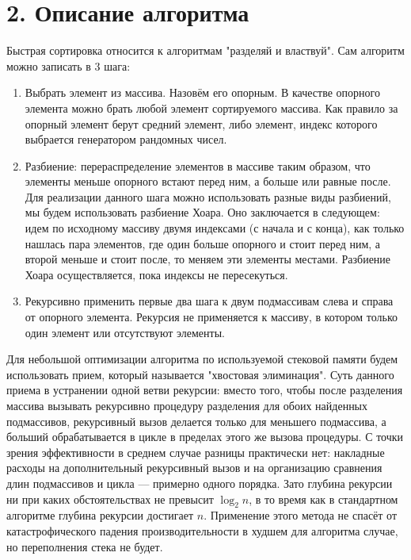 \documentclass{report}
\begin{document}
\newpage
\section*{2. Описание алгоритма}

\par Быстрая сортировка относится к алгоритмам "разделяй и властвуй".
Сам алгоритм можно записать в 3 шага:
\begin{enumerate}
\item Выбрать элемент из массива. Назовём его опорным. В качестве опорного элемента можно брать любой элемент сортируемого массива. Как правило за опорный элемент берут средний элемент, либо элемент, индекс которого выбрается генератором рандомных чисел.
\item Разбиение: перераспределение элементов в массиве таким образом, что элементы меньше опорного встают перед ним, а больше или равные после. Для реализации данного шага можно использовать разные виды разбиений, мы будем использовать разбиение Хоара. Оно заключается в следующем: идем по исходному массиву двумя индексами (с начала и с конца), как только нашлась пара элементов, где один больше опорного и стоит перед ним, а второй меньше и стоит после, то меняем эти элементы местами. Разбиение Хоара осуществляется, пока индексы не пересекуться.
\item Рекурсивно применить первые два шага к двум подмассивам слева и справа от опорного элемента. Рекурсия не применяется к массиву, в котором только один элемент или отсутствуют элементы.
\end{enumerate}
\par Для небольшой оптимизации алгоритма по используемой стековой памяти будем использовать прием, который называется "хвостовая элиминация". Суть данного приема в устранении одной ветви рекурсии: вместо того, чтобы после разделения массива вызывать рекурсивно процедуру разделения для обоих найденных подмассивов, рекурсивный вызов делается только для меньшего подмассива, а больший обрабатывается в цикле в пределах этого же вызова процедуры. С точки зрения эффективности в среднем случае разницы практически нет: накладные расходы на дополнительный рекурсивный вызов и на организацию сравнения длин подмассивов и цикла — примерно одного порядка. Зато глубина рекурсии ни при каких обстоятельствах не превысит $\log_2 n$, в то время как в стандартном алгоритме глубина рекурсии достигает $n$. Применение этого метода не спасёт от катастрофического падения производительности в худшем для алгоритма случае, но переполнения стека не будет.
\end{document}
